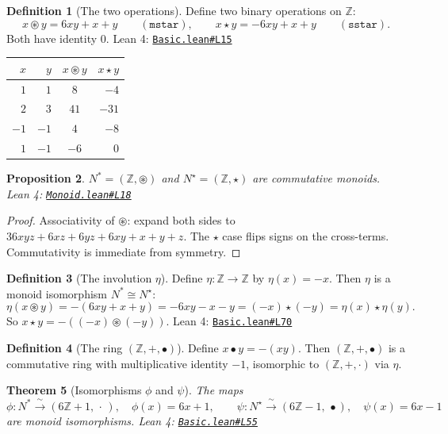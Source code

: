 \documentclass[11pt,a4paper]{amsart}
\theoremstyle{plain}
\newtheorem{theorem}{Theorem}[section]
\newtheorem{proposition}[theorem]{Proposition}
\theoremstyle{definition}
\newtheorem{definition}[theorem]{Definition}
\theoremstyle{remark}
\newcommand{\mstar}{\mathbin{\circledast}}  %
\newcommand{\sstar}{\mathbin{\star}}        %
\newcommand{\bul}{\mathbin{\bullet}}        %
\newcommand{\Z}{\mathbb{Z}}
\newcommand{\Nstar}{N^*}
\newcommand{\Nsstar}{N^\star}
\newcommand{\phii}{\phi}                   %
\newcommand{\psii}{\psi}                   %
\newcommand{\etaa}{\eta}                   %
\newcommand{\GH}{https://github.com/FruitfulApproach/Lean4TPC/blob/main}
\begin{document}
\begin{definition}[The two operations]
\label{def:ops}
Define two binary operations on $\Z$:
\[
x \mstar y = 6xy + x + y \qquad (\texttt{mstar}),
\qquad
x \sstar y = -6xy + x + y \qquad (\texttt{sstar}).
\]
Both have identity $0$.
\textnormal{Lean 4:} \href{\GH/TPC/Basic.lean\#L15}{\texttt{Basic.lean\#L15}}
\end{definition}

\begin{center}
\begin{tabular}{rrcr}
\toprule
$x$ & $y$ & $x \mstar y$ & $x \sstar y$ \\
\midrule
$1$ & $1$ & $8$ & $-4$ \\
$2$ & $3$ & $41$ & $-31$ \\
$-1$ & $-1$ & $4$ & $-8$ \\
$1$ & $-1$ & $-6$ & $0$ \\
\bottomrule
\end{tabular}
\end{center}

\begin{proposition}
\label{prop:commmonoid}
$\Nstar = (\Z, \mstar)$ and $\Nsstar = (\Z, \sstar)$ are commutative monoids.
\textnormal{Lean 4:} \href{\GH/TPC/Monoid.lean\#L18}{\texttt{Monoid.lean\#L18}}
\end{proposition}

\begin{proof}
Associativity of $\mstar$: expand both sides to $36xyz + 6xz + 6yz + 6xy
+ x + y + z$.  The $\sstar$ case flips signs on the cross-terms.
Commutativity is immediate from symmetry.
\end{proof}

\begin{definition}[The involution $\etaa$]
Define $\etaa : \Z \to \Z$ by $\etaa(x) = -x$.  Then $\etaa$ is a monoid
isomorphism $\Nstar \cong \Nsstar$:
\[
\etaa(x \mstar y) = -(6xy+x+y) = -6xy-x-y = (-x) \sstar (-y) = \etaa(x) \sstar \etaa(y).
\]
So $x \sstar y = -((-x) \mstar (-y))$.
\textnormal{Lean 4:} \href{\GH/TPC/Basic.lean\#L70}{\texttt{Basic.lean\#L70}}
\end{definition}

\begin{definition}[The ring $(\Z,+,\bul)$]
Define $x \bul y = -(xy)$.  Then $(\Z,+,\bul)$ is a commutative ring with
multiplicative identity $-1$, isomorphic to $(\Z,+,\cdot)$ via $\etaa$.
\end{definition}

\begin{theorem}[Isomorphisms $\phii$ and $\psii$]
\label{thm:isos}
The maps
\[
\phii : \Nstar \xrightarrow{\;\sim\;} (6\Z+1,\,\cdot\,),\quad \phii(x) = 6x+1,
\qquad
\psii : \Nsstar \xrightarrow{\;\sim\;} (6\Z-1,\,\bul),\quad \psii(x) = 6x-1
\]
are monoid isomorphisms.
\textnormal{Lean 4:} \href{\GH/TPC/Basic.lean\#L55}{\texttt{Basic.lean\#L55}}
\end{theorem}
\end{document}
